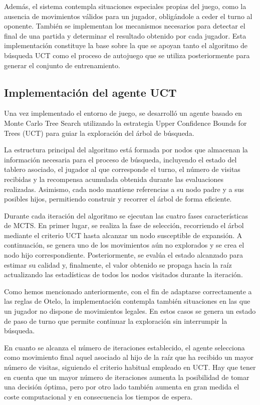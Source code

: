 \documentclass[conference,a4paper]{IEEEtran}
\begin{document}
Además, el sistema contempla situaciones especiales propias del juego, como la ausencia de movimientos válidos para un jugador, obligándole a ceder el turno al oponente. 
También se implementan los mecanismos necesarios para detectar el final de una partida y determinar el resultado obtenido por cada jugador. 
Esta implementación constituye la base sobre la que se apoyan tanto el algoritmo de búsqueda UCT como el proceso de autojuego que se utiliza posteriormente para generar el conjunto de entrenamiento. 

\subsection{Implementación del agente UCT} 
Una vez implementado el entorno de juego, se desarrolló un agente basado en Monte Carlo Tree Search utilizando la estrategia Upper Confidence Bounds for Trees (UCT) para guiar la exploración del árbol de búsqueda. 

La estructura principal del algoritmo está formada por nodos que almacenan la información necesaria para el proceso de búsqueda, incluyendo el estado del tablero asociado, el jugador al que corresponde el turno, el número de visitas recibidas y la recompensa acumulada obtenida durante las evaluaciones realizadas. 
Asimismo, cada nodo mantiene referencias a su nodo padre y a sus posibles hijos, permitiendo construir y recorrer el árbol de forma eficiente. 

Durante cada iteración del algoritmo se ejecutan las cuatro fases características de MCTS. 
En primer lugar, se realiza la fase de selección, recorriendo el árbol mediante el criterio UCT hasta alcanzar un nodo susceptible de expansión. 
A continuación, se genera uno de los movimientos aún no explorados y se crea el nodo hijo correspondiente. 
Posteriormente, se evalúa el estado alcanzado para estimar su calidad y, finalmente, el valor obtenido se propaga hacia la raíz actualizando las estadísticas de todos los nodos visitados durante la iteración. 

Como hemos mencionado anteriormente, con el fin de adaptarse correctamente a las reglas de Otelo, la implementación contempla también situaciones en las que un jugador no dispone de movimientos legales. 
En estos casos se genera un estado de paso de turno que permite continuar la exploración sin interrumpir la búsqueda. 

En cuanto se alcanza el número de iteraciones establecido, el agente selecciona como movimiento final aquel asociado al hijo de la raíz que ha recibido un mayor número de visitas, siguiendo el criterio habitual empleado en UCT. 
Hay que tener en cuenta que un mayor número de iteraciones aumenta la posibilidad de tomar una decisión óptima, pero por otro lado también aumenta en gran medida el coste computacional y en consecuencia los tiempos de espera. 
\end{document}
